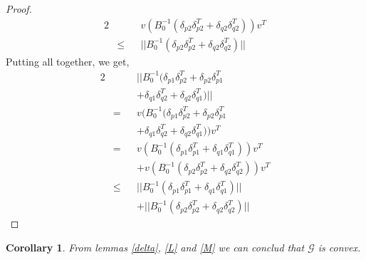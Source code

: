 \documentclass[11pt,twocolumn,varwidth=true,a4paper,fleqn]{article}
\newtheorem{corollary}{Corollary}
\begin{document}
\begin{proof}
\begin{alignat*}{2}
 & && v(B_0^{-1}(\delta_{p2}\delta_{p2}^T + \delta_{q2}\delta_{q2}^T))v^T \\
 & \leq && ||B_0^{-1}(\delta_{p2}\delta_{p2}^T + \delta_{q2}\delta_{q2}^T)||
\end{alignat*}
Putting all together, we get,
\begin{alignat*}{2}
& &&||B_0^{-1}(\delta_{p1}\delta_{p2}^T+\delta_{p2}\delta_{p1}^T \\
& &&+\delta_{q1}\delta_{q2}^T+\delta_{q2}\delta_{q1}^T)|| \\
& = && v(B_0^{-1}(\delta_{p1}\delta_{p2}^T+\delta_{p2}\delta_{p1}^T\\
& && +\delta_{q1}\delta_{q2}^T+\delta_{q2}\delta_{q1}^T))v^T\\
& = && v(B_0^{-1}(\delta_{p1}\delta_{p1}^T + \delta_{q1}\delta_{q1}^T))v^T \\
& && + v(B_0^{-1}(\delta_{p2}\delta_{p2}^T + \delta_{q2}\delta_{q2}^T))v^T \\
& \leq &&  ||B_0^{-1}(\delta_{p1}\delta_{p1}^T + \delta_{q1}\delta_{q1}^T)|| \\
& && + ||B_0^{-1}(\delta_{p2}\delta_{p2}^T + \delta_{q2}\delta_{q2}^T)||
\end{alignat*}
\end{proof}

\begin{corollary}
From lemmas \ref{delta}, \ref{L} and \ref{M} we can conclud that $\mathcal{G}$
is convex.
\end{corollary}
\end{document}
